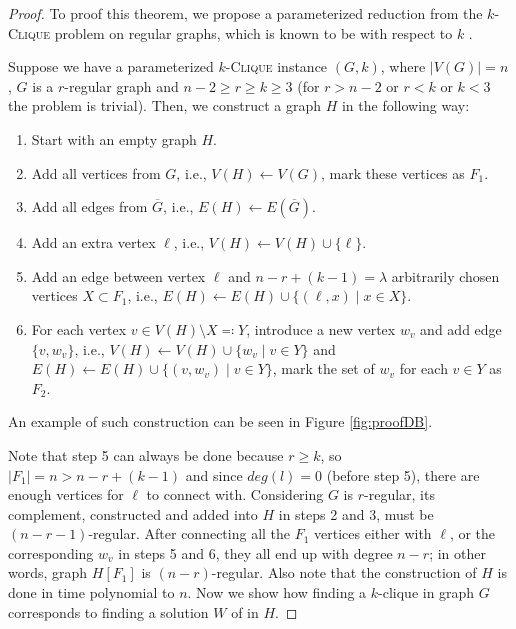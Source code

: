 \begin{proof}\label{proofDB}
    To proof this theorem, we propose a parameterized reduction from the $k$-\textsc{Clique} problem on regular graphs,
    which is known to be \Wh with respect to $k$ \cite{Mathieson2008}.
    
    Suppose we have a parameterized $k$-\textsc{Clique} instance $(G, k)$, where $|V(G)|=n$, $G$ is a $r$-regular graph and $n-2 \geq r \geq k \geq 3$
    (for $r > n-2$ or $r < k$ or $k < 3$ the problem is trivial).
    Then, we construct a graph $H$ in the following way:
    \begin{enumerate}
        \item Start with an empty graph $H$.
        \item Add all vertices from $G$, i.e., $V(H) \leftarrow V(G)$, mark these vertices as $F_1$.
        \item Add all edges from $\overline{G}$, i.e., $E(H) \leftarrow E(\overline{G})$.
        \item Add an extra vertex $\ell$, i.e., $V(H) \leftarrow V(H) \cup \{\ell\}$.
        \item Add an edge between vertex $\ell$ and $n - r + (k - 1) = \lambda$ arbitrarily chosen vertices $X \subset F_1$,
              i.e., $E(H) \leftarrow E(H) \cup \{ (\ell, x) \mid x \in X \}$.
        \item For each vertex $v \in V(H) \setminus X \eqqcolon Y$, introduce a new vertex $w_v$ and add edge $\{v, w_v\}$, i.e.,
              $V(H) \leftarrow V(H) \cup \{ w_v \mid v \in Y \}$ and $E(H) \leftarrow E(H) \cup \{ (v, w_v) \mid v \in Y \}$,
              mark the set of $w_v$ for each $v \in Y$ as $F_2$.
    \end{enumerate}
    An example of such construction can be seen in Figure \ref{fig:proofDB}.

    Note that step 5 can always be done because $r \ge k$, so $|F_1| = n > n - r + (k - 1)$
    and since $deg(l) = 0$ (before step 5), there are enough vertices for $\ell$ to connect with.
    Considering $G$ is $r$-regular, its complement, constructed and added into $H$ in steps 2 and 3, must be $(n-r-1)$-regular.
    After connecting all the $F_1$ vertices either with $\ell$, or the corresponding $w_v$ in steps 5 and 6,
    they all end up with degree $n-r$; in other words, graph $H[F_1]$ is $(n-r)$-regular.
    Also note that the construction of $H$ is done in time polynomial to $n$.
    Now we show how finding a $k$-clique in graph $G$ corresponds to finding a solution $W$ of \HLshort in $H$.


\end{proof}
